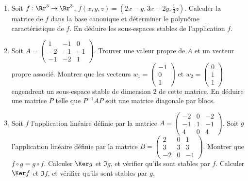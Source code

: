 \documentclass[12pt, class=report,crop=false]{standalone}
\begin{document}
 
\begin{miniexercices}
\sauteligne
\begin{enumerate}

  \item Soit $f : \Rr^3 \to \Rr^3$,
  $f(x,y,z) = (2x-y,3x-2y,\frac13z)$. Calculer la matrice de $f$ dans la base canonique et déterminer le polynôme caractéristique de $f$. En déduire les sous-espaces stables de l'application $f$.
    
  \item Soit  $A = 
  \left(\begin{smallmatrix}
1 & -1 & 0 \\
-2 & -1 & -1 \\
-1 & -2 & 1  
  \end{smallmatrix}\right)$.
  Trouver une valeur propre de $A$ et un vecteur propre associé.   
  Montrer que les vecteurs 
  $w_1 = \left(\begin{smallmatrix}-1\\0\\1\end{smallmatrix}\right)$ et $w_2 = \left(\begin{smallmatrix}0\\1\\1\end{smallmatrix}\right)$ engendrent un sous-espace stable de dimension $2$ de cette matrice. En déduire une matrice $P$ telle que $P^{-1}AP$ soit une matrice diagonale par blocs.
  
  \item Soit $f$ l'application linéaire définie
  par la matrice 
  $A = 
  \left(\begin{smallmatrix}
-2 & 0 & -2 \\
-1 & 1 & -1 \\
4 & 0 & 4
\end{smallmatrix}\right)$.
Soit $g$ l'application linéaire définie
  par la matrice 
  $B = 
  \left(\begin{smallmatrix}
2 & 0 & 1 \\
3 & 3 & 3 \\
-2 & 0 & -1
\end{smallmatrix}\right)$.
  Montrer que $f \circ g = g \circ f$. Calculer $\Ker g$ et $\Im g$, et vérifier qu'ils sont stables par $f$. Calculer $\Ker f$ et $\Im f$, et vérifier qu'ils sont stables par $g$.
  
\end{enumerate}
\end{miniexercices}
\end{document}
